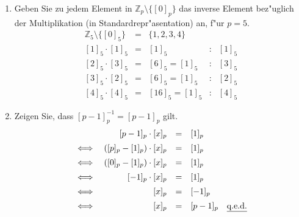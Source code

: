 \documentclass[10pt, oneside]{article}
\begin{document}
\begin{enumerate}
    \item Geben Sie zu jedem Element in $\mathbb{Z}_p \setminus \{[0]_p\}$ das
        inverse Element bez"uglich der Multiplikation (in
        Standardrepr"asentation) an, f"ur $p = 5$.
        \begin{equation*}
            \begin{array}{rclcl}
                \mathbb{Z}_5 \setminus \{[0]_5\} &=& \{1, 2, 3, 4\}&& \\[10pt]
                [1]_5 \cdot [1]_5 &=& [1]_5 &:& [1]_5 \\[5pt]
                [2]_5 \cdot [3]_5 &=& [6]_5 = [1]_5 &:& [3]_5 \\[5pt]
                [3]_5 \cdot [2]_5 &=& [6]_5 = [1]_5 &:& [2]_5 \\[5pt]
                [4]_5 \cdot [4]_5 &=& [16]_5 = [1]_5 &:& [4]_5
            \end{array}
        \end{equation*}
    \item Zeigen Sie, dass $[p - 1]^{-1}_p = [p - 1]_p$ gilt.
        \begin{equation*}
            \begin{array}{rrcl}
                    &[p - 1]_p \cdot [x]_p &=& [1]_p \\[5pt]
                \iff&([p]_p - [1]_p) \cdot [x]_p &=& [1]_p \\[5pt]
                \iff&([0]_p - [1]_p) \cdot [x]_p &=& [1]_p \\[5pt]
                \iff&[-1]_p \cdot [x]_p &=& [1]_p \\[5pt]
                \iff&[x]_p &=& [-1]_p \\[5pt]
                \iff&[x]_p &=& [p - 1]_p \quad \text{\underline{q.e.d.}}
             \end{array}
        \end{equation*}
\end{enumerate}
\end{document}
